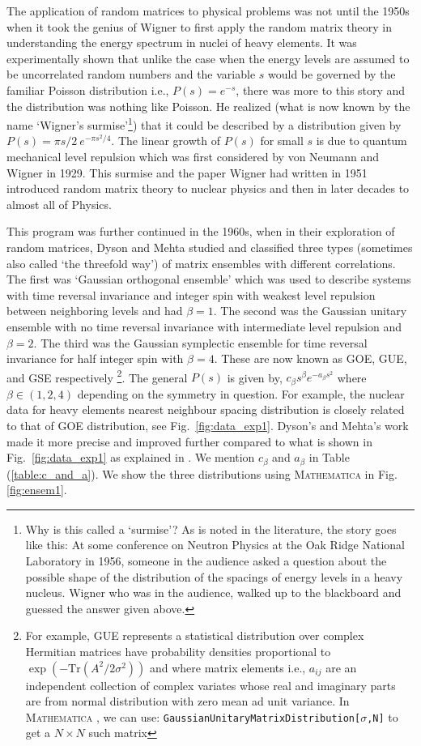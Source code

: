 \documentclass[11pt]{article}
\newcommand{\MA}{\textsc{Mathematica }}
\begin{document}
The application of random matrices to physical problems was not until the 1950s
when it took the genius of Wigner to first apply the random matrix theory 
in understanding the energy spectrum in nuclei of heavy elements. It was experimentally 
shown that unlike the case when the energy levels are assumed to be uncorrelated
random numbers and the variable $s$ would be governed by the familiar Poisson distribution i.e., $P(s) = e^{-s}$, 
there was more to this story and the distribution was nothing like Poisson. 
He realized (what is now known by the name `Wigner's surmise'\footnote{Why is this called a `surmise'? 
As is noted in the literature, the story goes like this: At some conference on Neutron Physics at the Oak 
Ridge National Laboratory in 1956, someone in the audience asked a question about the possible shape 
of the distribution of the spacings of energy levels in a heavy nucleus. Wigner who was in the audience, walked up to the blackboard and guessed the answer given above.}) that it could be described by a distribution given by $P(s) = \pi s/2~e^{-\pi s^2/4}$. 
The linear growth of $P(s)$ for small $s$ is due to quantum mechanical level repulsion 
which was first considered by von Neumann and Wigner in 1929. 
This surmise and the paper Wigner had written in 1951
\cite{Wigner1951OnTS} introduced random matrix theory 
to nuclear physics and then in later decades to almost all of Physics.

This program was further continued in the 1960s, when in their exploration of random matrices, 
Dyson and Mehta studied and classified three types (sometimes also called `the threefold way') 
of matrix ensembles with different correlations. The first was `Gaussian orthogonal ensemble' which was used to describe systems with time reversal invariance and integer spin with weakest level repulsion between neighboring levels and had $\beta=1$. The second was the Gaussian unitary ensemble with no time reversal invariance with intermediate level repulsion and $\beta=2$. The third was the Gaussian symplectic ensemble for time reversal invariance for half integer spin with $\beta=4$. These are now known as GOE, GUE, and GSE respectively \footnote{For example, GUE represents a statistical distribution over complex Hermitian matrices 
have probability densities proportional to $ \exp(-\mbox{Tr}(A^2/2\sigma^2))$ and
where matrix elements i.e., $a_{ij}$ are an independent collection of complex 
variates whose real and imaginary parts are from normal distribution
with zero mean ad unit variance. In \MA, we can use: 
\texttt{GaussianUnitaryMatrixDistribution[$\sigma$,N]}
to get a $N \times N$ such matrix}. 
The general $P(s)$ is given by, $c_{\beta}s^{\beta} e^{-a_{\beta}s^2}$ 
where $\beta \in (1,2,4)$ depending on the symmetry in question. 
For example, the nuclear data for heavy elements nearest neighbour spacing distribution
is closely related to that of GOE distribution, see Fig.~\ref{fig:data_exp1}. 
Dyson's and Mehta's work made it more precise and improved further 
compared to what is shown in Fig.~\ref{fig:data_exp1} as explained in 
\cite{PhysRevLett.48.1086}. We mention $c_{\beta}$ and  $a_{\beta}$ in Table (\ref{table:c_and_a}). 
We show the three distributions using \MA in Fig. \ref{fig:ensem1}.  
\end{document}
